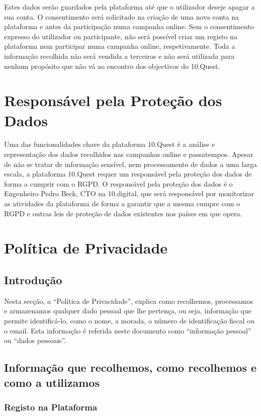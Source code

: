 Estes dados serão guardados pela plataforma até que o utilizador deseje apagar a sua conta. O consentimento será solicitado na criação de uma nova conta na plataforma e antes da participação numa campanha online. Sem o consentimento expresso do utilizador ou participante, não será possível criar um registo na plataforma nem participar numa campanha online, respetivamente. Toda a informação recolhida não será vendida a terceiros e não será utilizada para nenhum propósito que não vá ao encontro dos objectivos do 10.Quest.

\section{Responsável pela Proteção dos Dados}

Uma das funcionalidades chave da plataforma 10.Quest é a análise e representação dos dados recolhidos nas campanhas online e passatempos. Apesar de não se tratar de informação sensível, nem processamento de dados a uma larga escala, a plataforma 10.Quest requer um responsável pela proteção dos dados de forma a cumprir com o RGPD. O responsável pela proteção dos dados é o Engenheiro Pedro Beck, CTO na 10.digital, que será responsável por monitorizar as atividades da plataforma de forma a garantir que a mesma cumpre com o RGPD e outras leis de proteção de dados existentes nos países em que opera.

\section{Política de Privacidade}

\subsection{Introdução}

Nesta secção, a “Política de Privacidade”, explica como recolhemos, processamos e armazenamos qualquer dado pessoal que lhe pertença, ou seja, informação que permite identificá-lo, como o nome, a morada, o número de identificação fiscal ou o email. Esta informação é referida neste documento como “informação pessoal” ou “dados pessoais”.

\subsection{Informação que recolhemos, como recolhemos e como a utilizamos}

\subsubsection{Registo na Plataforma}

